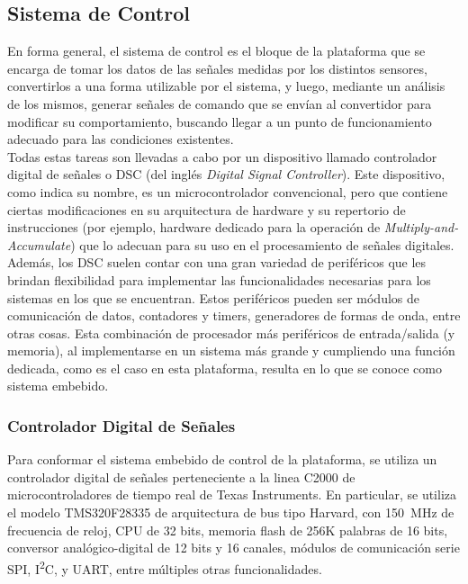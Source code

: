 \subsection{Sistema de Control}

En forma general, el sistema de control es el bloque de la plataforma que se encarga de tomar los datos de las señales medidas por los distintos sensores, convertirlos a una forma utilizable por el sistema, y luego, mediante un análisis de los mismos, generar señales de comando que se envían al convertidor para modificar su comportamiento, buscando llegar a un punto de funcionamiento adecuado para las condiciones existentes.\\

Todas estas tareas son llevadas a cabo por un dispositivo llamado {\Medium controlador digital de señales} o DSC (del inglés \textit{Digital Signal Controller}). Este dispositivo, como indica su nombre, es un microcontrolador convencional, pero que contiene ciertas modificaciones en su arquitectura de hardware y su repertorio de instrucciones (por ejemplo, hardware dedicado para la operación de \textit{Multiply-and-Accumulate}) que lo adecuan para su uso en el procesamiento de señales digitales.\\

Además, los DSC suelen contar con una gran variedad de periféricos que les brindan flexibilidad para implementar las funcionalidades necesarias para los sistemas en los que se encuentran. Estos periféricos pueden ser módulos de comunicación de datos, contadores y timers, generadores de formas de onda, entre otras cosas. Esta combinación de procesador más periféricos de entrada/salida (y memoria), al implementarse en un sistema más grande y cumpliendo una función dedicada, como es el caso en esta plataforma, resulta en lo que se conoce como {\Medium sistema embebido}.\\

\subsubsection{Controlador Digital de Señales}

Para conformar el sistema embebido de control de la plataforma, se utiliza un controlador digital de señales perteneciente a la linea {\Medium C2000} de microcontroladores de tiempo real de Texas Instruments. En particular, se utiliza el modelo {\Medium TMS320F28335} de arquitectura de bus tipo Harvard, con \SI[]{150}{\mega\hertz} de frecuencia de reloj, CPU de 32 bits, memoria flash de 256K palabras de 16 bits, conversor analógico-digital de 12 bits y 16 canales, módulos de comunicación serie SPI, I\textsuperscript{2}C, y UART, entre múltiples otras funcionalidades.\textsuperscript{\cite{DSP-Datasheet}}

